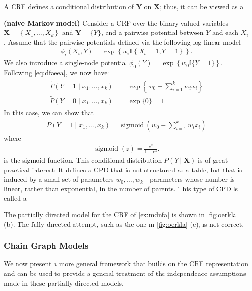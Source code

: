 \documentclass{article}
\newcommand{\bfs}[1]{\textbf{({#1}) }}
\begin{document}
A CRF defines a conditional distribution of $\boldsymbol{Y}$ on $\boldsymbol{X}$; thus, it can be viewed as a 
\begin{exma}\bfs{naive Markov model}
Consider a CRF over the binary-valued variables $\boldsymbol{X}=\left\{X_{1}, \ldots, X_{k}\right\}$ and $\boldsymbol{Y}=\{Y\}$, and a pairwise potential between $Y$ and each $X_{i}$. Assume that the pairwise potentials defined via the following log-linear model
\begin{align*}
\phi_{i}\left(X_{i}, Y\right)=\exp \left\{w_{i} \mathbf{I}\left\{X_{i}=1, Y=1\right\}\right\} .
\end{align*}
We also introduce a single-node potential $\phi_{0}(Y)=\exp \left\{w_{0} \mathbb{I}\{Y=1\}\right\}$. Following \cref{eq:dfaeea},
we now have:
\begin{align*}
\begin{aligned}
\tilde{P}\left(Y=1 \mid x_{1}, \ldots, x_{k}\right) &=\exp \left\{w_{0}+\sum_{i=1}^{k} w_{i} x_{i}\right\} \\
\tilde{P}\left(Y=0 \mid x_{1}, \ldots, x_{k}\right) &=\exp \{0\}=1
\end{aligned}
\end{align*}
In this case, we can show that
\begin{align*}
P\left(Y=1 \mid x_{1}, \ldots, x_{k}\right)=\operatorname{sigmoid}\left(w_{0}+\sum_{i=1}^{k} w_{i} x_{i}\right)
\end{align*}
where
\begin{align*}
\operatorname{sigmoid}(z)=\frac{e^{z}}{1+e^{z}}.
\end{align*}
is the sigmoid function. This conditional distribution $P(Y \mid \boldsymbol{X})$ is of great practical interest: It defines a CPD that is not structured as a table, but that is induced by a small set of parameters $w_{0}, \ldots, w_{k}$ - parameters whose number is linear, rather than exponential, in the number of parents. This type of CPD is  called a 
\end{exma}
\begin{exma}
The partially directed model for the CRF of \cref{ex:mdnfa} is shown in \cref{fig:oerkla} (b). The fully directed attempt, such as the one in \cref{fig:oerkla} (c), is not correct. 
\end{exma}
\subsubsection{Chain Graph Models}
We now present a more general framework that builds on the CRF representation and can be used to provide a general treatment of the independence assumptions made in these partially directed models. 
\end{document}
